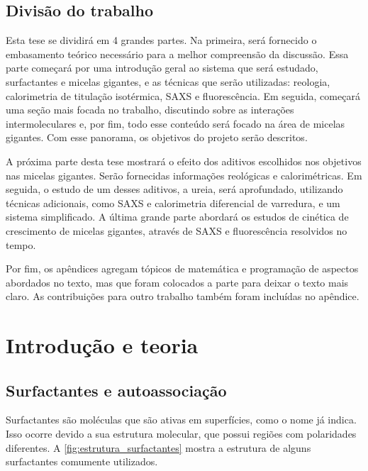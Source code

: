 
	\chapter*{Divisão do trabalho}
Esta tese se dividirá em 4 grandes partes. Na primeira, será fornecido o embasamento teórico necessário para a melhor compreensão da discussão. Essa parte começará por uma introdução geral ao sistema que será estudado, surfactantes e micelas gigantes, e as técnicas que serão utilizadas: reologia, calorimetria de titulação isotérmica, SAXS e fluorescência. Em seguida, começará uma seção mais focada no trabalho, discutindo sobre as interações intermoleculares e, por fim, todo esse conteúdo será focado na área de micelas gigantes. Com esse panorama, os objetivos do projeto serão descritos.

A próxima parte desta tese mostrará o efeito dos aditivos escolhidos nos objetivos nas micelas gigantes. Serão fornecidas informações reológicas e calorimétricas. Em seguida, o estudo de um desses aditivos, a ureia, será aprofundado, utilizando técnicas adicionais, como SAXS e calorimetria diferencial de varredura, e um sistema simplificado. A última grande parte abordará os estudos de cinética de crescimento de micelas gigantes, através de SAXS e fluorescência resolvidos no tempo.

Por fim, os apêndices agregam tópicos de matemática e programação de aspectos abordados no texto, mas que foram colocados a parte para deixar o texto mais claro. As contribuições para outro trabalho também foram incluídas no apêndice.


\part{Introdução e teoria}


	\chapter{Surfactantes e autoassociação}
	\label{sec:surfactantes_autoassociação}
	Surfactantes são moléculas que são ativas em superfícies, como o nome já indica.\cite{Lindman_livro} Isso ocorre devido a sua estrutura molecular, que possui regiões com polaridades diferentes. A \autoref{fig:estrutura_surfactantes} mostra a estrutura de alguns surfactantes comumente utilizados.
	
